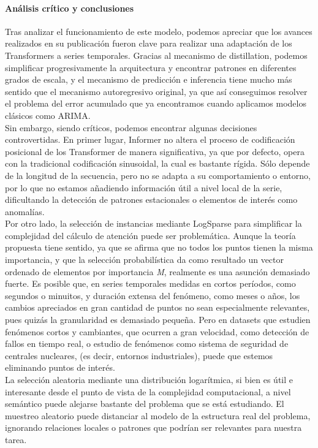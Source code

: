 \paragraph{Análisis crítico y conclusiones}
Tras analizar el funcionamiento de este modelo, podemos apreciar que los avances realizados en su publicación fueron clave para realizar una adaptación de los Transformers a series temporales. Gracias al mecanismo de distillation, podemos simplificar progresivamente la arquitectura y encontrar patrones en diferentes grados de escala, y el mecanismo de predicción e inferencia tiene mucho más sentido que el mecanismo autoregresivo original, ya que así conseguimos resolver el problema del error acumulado que ya encontramos cuando aplicamos modelos clásicos como ARIMA.\\

Sin embargo, siendo críticos, podemos encontrar algunas decisiones controvertidas. En primer lugar, Informer no altera el proceso de codificación posicional de los Transformer de manera significativa, ya que por defecto, opera con la tradicional codificación sinusoidal, la cual es bastante rígida. Sólo depende de la longitud de la secuencia, pero no se adapta a su comportamiento o entorno, por lo que no estamos añadiendo información útil a nivel local de la serie, dificultando la detección de patrones estacionales o elementos de interés como  anomalías.\\

Por otro lado, la selección de instancias mediante LogSparse para simplificar la complejidad del cálculo de atención puede ser problemática. Aunque la teoría propuesta tiene sentido, ya que se afirma que no todos los puntos tienen la misma importancia, y que la selección probabilística da como resultado un vector ordenado de elementos por importancia \textit{M}, realmente es una asunción demasiado fuerte. Es posible que, en series temporales medidas en cortos períodos, como segundos o minuitos, y duración extensa del fenómeno, como meses o años, los cambios apreciados en gran cantidad de puntos no sean especialmente relevantes, pues quizás la granularidad es demasiado pequeña. Pero en datasets que estudien fenómenos cortos y cambiantes, que ocurren a gran velocidad, como detección de fallos en tiempo real, o estudio de fenómenos como sistema de seguridad de centrales nucleares, (es decir, entornos industriales), puede que estemos eliminando puntos de interés.\\

La selección aleatoria mediante una distribución logarítmica, si bien es útil e interesante desde el punto de vista de la complejidad computacional, a nivel semántico puede alejarse bastante del problema que se está estudiando. El muestreo aleatorio puede distanciar al modelo de la estructura real del problema, ignorando relaciones locales o patrones que podrían ser relevantes para nuestra tarea.\\

